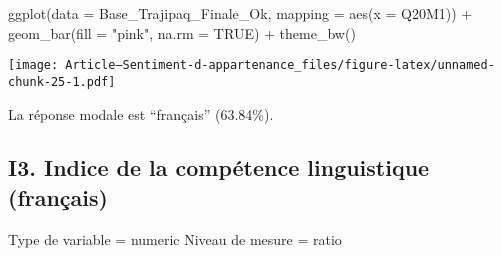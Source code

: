 \documentclass[
]{article}
\newenvironment{Shaded}{\begin{snugshade}}{\end{snugshade}}
\newcommand{\AttributeTok}[1]{\textcolor[rgb]{0.77,0.63,0.00}{#1}}
\newcommand{\ConstantTok}[1]{\textcolor[rgb]{0.00,0.00,0.00}{#1}}
\newcommand{\FunctionTok}[1]{\textcolor[rgb]{0.00,0.00,0.00}{#1}}
\newcommand{\NormalTok}[1]{#1}
\newcommand{\SpecialCharTok}[1]{\textcolor[rgb]{0.00,0.00,0.00}{#1}}
\newcommand{\StringTok}[1]{\textcolor[rgb]{0.31,0.60,0.02}{#1}}
\begin{document}
\begin{Shaded}
\begin{Highlighting}[]
\FunctionTok{ggplot}\NormalTok{(}\AttributeTok{data =}\NormalTok{ Base\_Trajipaq\_Finale\_Ok, }\AttributeTok{mapping =} \FunctionTok{aes}\NormalTok{(}\AttributeTok{x =}\NormalTok{ Q20M1)) }\SpecialCharTok{+}
  \FunctionTok{geom\_bar}\NormalTok{(}\AttributeTok{fill =} \StringTok{"pink"}\NormalTok{, }\AttributeTok{na.rm =} \ConstantTok{TRUE}\NormalTok{) }\SpecialCharTok{+}
  \FunctionTok{theme\_bw}\NormalTok{()}
\end{Highlighting}
\end{Shaded}

\texttt{[image: Article---Sentiment-d-appartenance\_files/figure-latex/unnamed-chunk-25-1.pdf]}

La réponse modale est ``français'' (63.84\%).

\hypertarget{i3.-indice-de-la-compuxe9tence-linguistique-franuxe7ais}{%
\subsection{I3. Indice de la compétence linguistique
(français)}\label{i3.-indice-de-la-compuxe9tence-linguistique-franuxe7ais}}

Type de variable = numeric Niveau de mesure = ratio
\end{document}
